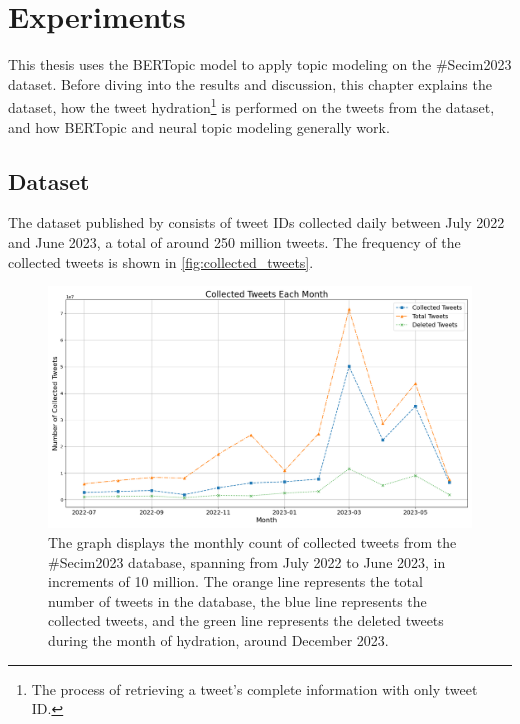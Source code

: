 
\chapter{Experiments}\label{chapter:experiments}

This thesis uses the BERTopic model to apply topic modeling on the \#Secim2023 dataset. 
Before diving into the results and discussion, this chapter explains the dataset, 
how the tweet hydration\footnote{The process of retrieving a tweet's complete information
with only tweet ID.} is performed on the tweets from the dataset, and how BERTopic and 
neural topic modeling generally work.

\section{Dataset}

The dataset published by \textcite{secim2023} consists of tweet IDs collected daily 
between July 2022 and June 2023, a total of around 250 million tweets. 
The frequency of the collected tweets is shown in \autoref{fig:collected_tweets}.

\begin{figure}[htb]
    \centering
    \includegraphics[width=\linewidth]{figures/collected_tweets_2.png}
    \caption[Collected Tweets Each Month]
    {The graph displays the monthly count of collected tweets from the \#Secim2023 database, 
    spanning from July 2022 to June 2023, in increments of 10 million.
    The orange line represents the total number of tweets in the database, 
    the blue line represents the collected tweets, and 
    the green line represents the deleted tweets during the month of hydration, around
    December 2023.}\label{fig:collected_tweets}
\end{figure}

